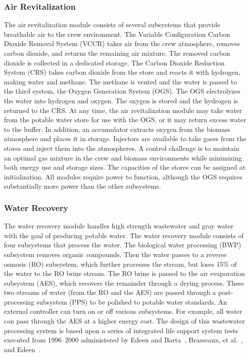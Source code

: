 \documentclass[submit]{aiaa}
\begin{document}
\subsubsection{Air Revitalization}

The air revitalization module consists of several subsystems that
provide breathable air to the crew environment.  The Variable
Configuration Carbon Dioxide Removal System (VCCR) takes air from the
crew atmosphere, removes carbon dioxide, and returns the remaining air
mixture.  The removed carbon dioxide is collected in a 
dedicated storage.  The Carbon Dioxide Reduction System (CRS) takes carbon dioxide from the store and reacts it with hydrogen, making water and methane.  The methane is vented and the
water is passed to the third system, the Oxygen Generation System (OGS).
The OGS electrolyzes the water into hydrogen and oxygen. 
The oxygen is stored and the hydrogen is returned to the CRS.  
At any time, the  air revitalization module may take water from the potable water store for use with the OGS, or it may return excess water to the buffer.    
In addition, an accumulator extracts oxygen from the biomass atmosphere and places it in storage.  Injectors
are available to take gases from the stores and inject them into the
atmospheres.  
A control challenge is to maintain an optimal gas mixture in the crew
and biomass environments while minimizing both energy use  and
storage sizes.
The capacities of the stores can be assigned at
initialization.  All modules require power to function,
although the OGS requires substantially more power than the other
subsystems.

\subsubsection{Water Recovery}

The water recovery module handles high strength wastewater and gray water with the goal of producing potable water.
The water recovery module consists of
four subsystems that process the water.  The biological water
processing (BWP) subsystem removes organic compounds.  Then the water
passes to a reverse osmosis (RO) subsystem, which further processes the stream, but loses 15\% of the water to the RO brine stream.
The RO brine is passed to the air evaporation subsystem (AES), which recovers the
remainder through a drying process.  
These two streams of water (from the RO and the AES) are
passed through a post-processing subsystem (PPS) to be polished to
potable water standards.  
An external controller can turn on or off various
subsystems.  For example, all water can pass through the AES at a
higher energy cost.  
The design of this wastewater processing system is based upon a series of integrated life support system tests executed from 1996--2000 administered by Edeen and Barta~\cite{ehti}, Brasseaux, et al.~\cite{lmlstpII}, and Edeen~\cite{lmlstpIII}.
\end{document}
